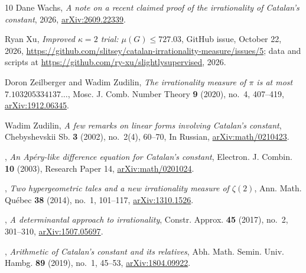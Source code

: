 \documentclass[11pt]{amsart}
\theoremstyle{definition}
\theoremstyle{remark}
\numberwithin{equation}{section}
\begin{document}
\begin{thebibliography}{10}
Dane Wachs, \emph{A note on a recent claimed proof of the irrationality of
  {C}atalan's constant}, 2026,
  \href{https://arxiv.org/abs/2609.22339}{arXiv:2609.22339}.

Ryan Xu, \emph{Improved {$\kappa=2$} trial: {$\mu(G)\le727.03$}}, GitHub issue,
  October 22, 2026,
  \url{https://github.com/slitsey/catalan-irrationality-measure/issues/5}; data
  and scripts at \url{https://github.com/ry-xu/slightlysupervised}, 2026.

Doron Zeilberger and Wadim Zudilin, \emph{The irrationality measure of {$\pi$}
  is at most {$7.103205334137\ldots$}}, Mosc. J. Comb. Number Theory \textbf{9}
  (2020), no.~4, 407--419,
  \href{https://arxiv.org/abs/1912.06345}{arXiv:1912.06345}.

Wadim Zudilin, \emph{A few remarks on linear forms involving {C}atalan's
  constant}, Chebyshevskii Sb. \textbf{3} (2002), no.~2(4), 60--70, In Russian,
  \href{https://arxiv.org/abs/math/0210423}{arXiv:math/0210423}.

\bysame, \emph{An {A}p\'ery-like difference equation for {C}atalan's constant},
  Electron. J. Combin. \textbf{10} (2003), Research Paper 14,
  \href{https://arxiv.org/abs/math/0201024}{arXiv:math/0201024}.

\bysame, \emph{Two hypergeometric tales and a new irrationality measure of
  {$\zeta(2)$}}, Ann. Math. Qu\'ebec \textbf{38} (2014), no.~1, 101--117,
  \href{https://arxiv.org/abs/1310.1526}{arXiv:1310.1526}.

\bysame, \emph{A determinantal approach to irrationality}, Constr. Approx.
  \textbf{45} (2017), no.~2, 301--310,
  \href{https://arxiv.org/abs/1507.05697}{arXiv:1507.05697}.

\bysame, \emph{Arithmetic of {C}atalan's constant and its relatives}, Abh.
  Math. Semin. Univ. Hambg. \textbf{89} (2019), no.~1, 45--53,
  \href{https://arxiv.org/abs/1804.09922}{arXiv:1804.09922}.

\end{thebibliography}
\end{document}
